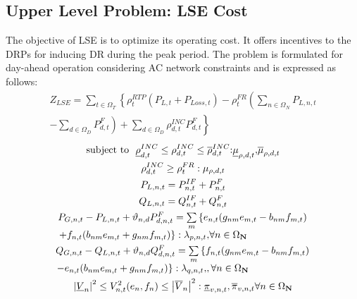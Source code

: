 \documentclass[journal]{IEEEtran}
\begin{document}
\subsection{Upper Level Problem: LSE Cost}
The objective of LSE is to optimize its operating cost. It offers incentives to the DRPs for inducing DR during the peak period. The problem is formulated for day-ahead operation considering AC network constraints and is expressed as follows\mbox{\cite{algarni2009generic,negash2014allocating,hurley2013demand}}:
\begin{multline}
	{Z_{LSE}} = \sum\limits_{t \in {\Omega _T}} {\left\{ {\rho _t^{RTP}({P_{L,t}+P_{Loss,t}})} \right.}  - \rho _t^{FR}\left( {\sum\limits_{n \in {\Omega _N}} {{P_{L,n,t}}} } \right.\\ 
	\left. {\left. { - \sum\limits_{d \in {\Omega _D}} {P_{d,t}^F} } \right) + \sum\limits_{d \in {\Omega _D}} {\rho _{d,t}^{INC}P_{d,t}^F} } \right\}
\end{multline}
\begin{gather}{\label{eq.1}}
{\rm{subject ~to}} ~~\underline \rho  _{d,t}^{INC} \le \rho _{d,t}^{INC} \le \overline \rho  _{d,t}^{INC}{\rm{:}}{\underline \mu  _{\rho ,d,t}}{\rm{, }}{\overline \mu  _{\rho ,d,t}}{\rm{  }}\\
\rho _{d,t}^{INC} \ge \rho _t^{FR}:{\mu _{\rho ,d,t}}\\
{P_{L,n,t}} = P_{n,t}^{IF} + P_{n,t}^F\\
{Q_{L,n,t}} = Q_{n,t}^{IF} + Q_{n,t}^F\\
\begin{array}{l}
	{P_{G,n,t}} - {P_{L,n,t}} + {\vartheta _{n,d}}P_{d,n,t}^F = \sum\limits_m {\left\{ {{e_{n,t}}({g_{nm}}{e_{m,t}} - {b_{nm}}{f_{m,t}})} \right.} \\
	\left. { + {f_{n,t}}({b_{nm}}{e_{m,t}} + {g_{nm}}{f_{m,t}})} \right\}:{\lambda _{p,n,t}}{\rm{,  }}\forall n \in {\Omega _\textbf{N}}
\end{array}\\
\begin{array}{l}
	{Q_{G,n,t}} - {Q_{L,n,t}} + {\vartheta _{n,d}}Q_{d,n,t}^F = \sum\limits_m {\left\{ {{f_{n,t}}({g_{nm}}{e_{m,t}} - {b_{nm}}{f_{m,t}})} \right.} \\
	\left. { - {e_{n,t}}({b_{nm}}{e_{m,t}} + {g_{nm}}{f_{m,t}})} \right\}:{\lambda _{q,n,t}}{\rm{,}},{\rm{ }}\forall n \in {\Omega _\textbf{N}}
\end{array}\\
{\left| {{{\underline V }_n}} \right|^2} \le V_{n,t}^2({e_n},{f_n}) \le {\left| {{{\overline V }_n}} \right|^2}:{\underline \pi  _{v,n,t}},{\overline \pi  _{v,n,t}}{\rm{      }}\forall n \in {\Omega _\textbf{N}}
\end{gather}
\end{document}
